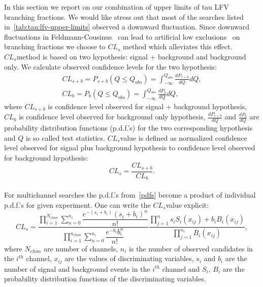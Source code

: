 \label{sec:tau:lfv_com}
\def\cls{$CL_s$}

In this section we report on our combination of upper limits of tau LFV branching fractions. We would like stress out that most of the searches listed in~\ref{tab:tau:lfv-upper-limits} observed a downward fluctuation. Since downward fluctuations in Feldmann-Cousinus~\cite{PhysRevD.57.3873} can lead to artificial low exclusions~\cite{PhysRevD.86.010001} on branching fractions we choose to \cls \cite{Mistlberger:2012rs} method which alleviates this effect. \\
\cls method is based on two hypothesis: signal + background and background only. We calculate observed confidence levels for the two hypothesis:
\begin{align}
CL_{s+b} = P_{s+b}(Q \leq Q_{obs}) = \int_{- \infty}^{Q_{obs}} \frac{dP_{s+b}}{dQ} dQ,\\
CL_{b} = P_{b}(Q \leq Q_{obs}) = \int_{- \infty}^{Q_{obs}} \frac{dP_{b}}{dQ} dQ,
\label{pdfs}
\end{align}
where $CL_{s+b}$ is confidence level observed for signal + background hypothesis, $CL_{b}$ is confidence level observed for background only hypothesis, $\frac{dP_{s+b}}{dQ}$ and $\frac{dP_{b}}{dQ}$ are probability distribution functions (p.d.f.'s) for the two corresponding hypothesis and $Q$ is so called test statistics. \cls value is defined as normalized confidence level observed for signal plus background hypothesis to confidence level observed for background hypothesis:
\begin{equation}
CL_s=\dfrac{CL_{s+b}}{CL_{b}}.
\end{equation}\\
For multichannel searches the p.d.f.'s from~\ref{pdfs} become a product of individual p.d.f.'s for given experiment. One can write the \cls value explicit:
\begin{equation}
CL_s = \dfrac{\prod_{i=1}^{N_{chan}}\sum_{n=0}^{n_i} \dfrac{e^{-(s_i+b_i)} (s_i+b_i)^{n}}{n!} }{\prod_{i=1}^{n_{chan}}  \sum_{n=0}^{n_i} \dfrac{e^{-b_i} b_i^{n}}{n!}}    \dfrac{\prod_{j=1}^{n} s_iS_i(x_{ij})+b_iB_i(x_{ij})}{\prod_{j=1}^{n_i}B_i(x_{ij})},
\end{equation}
where $N_{chan}$ are number of channels, $n_i$ is the number of observed candidates in the $i^{th}$ channel, $x_{ij}$ are the values of discriminating variables, $s_i$ and $b_i$ are the number of signal and background events in the $i^{th}$ channel and $S_i$, $B_i$ are the probability distribution functions of the discriminating variables. \\
